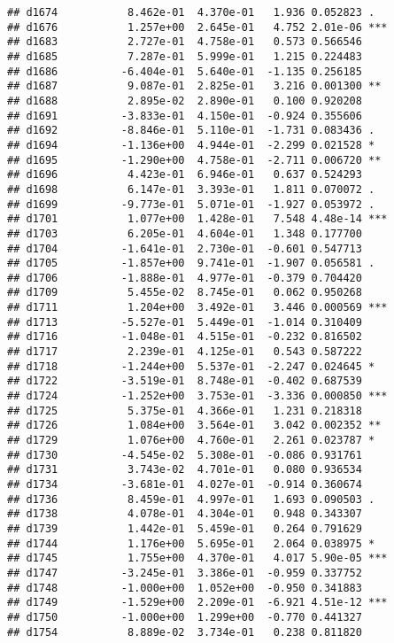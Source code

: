 \documentclass[
]{article}
\begin{document}
\begin{verbatim}
## d1674           8.462e-01  4.370e-01   1.936 0.052823 .  
## d1676           1.257e+00  2.645e-01   4.752 2.01e-06 ***
## d1683           2.727e-01  4.758e-01   0.573 0.566546    
## d1685           7.287e-01  5.999e-01   1.215 0.224483    
## d1686          -6.404e-01  5.640e-01  -1.135 0.256185    
## d1687           9.087e-01  2.825e-01   3.216 0.001300 ** 
## d1688           2.895e-02  2.890e-01   0.100 0.920208    
## d1691          -3.833e-01  4.150e-01  -0.924 0.355606    
## d1692          -8.846e-01  5.110e-01  -1.731 0.083436 .  
## d1694          -1.136e+00  4.944e-01  -2.299 0.021528 *  
## d1695          -1.290e+00  4.758e-01  -2.711 0.006720 ** 
## d1696           4.423e-01  6.946e-01   0.637 0.524293    
## d1698           6.147e-01  3.393e-01   1.811 0.070072 .  
## d1699          -9.773e-01  5.071e-01  -1.927 0.053972 .  
## d1701           1.077e+00  1.428e-01   7.548 4.48e-14 ***
## d1703           6.205e-01  4.604e-01   1.348 0.177700    
## d1704          -1.641e-01  2.730e-01  -0.601 0.547713    
## d1705          -1.857e+00  9.741e-01  -1.907 0.056581 .  
## d1706          -1.888e-01  4.977e-01  -0.379 0.704420    
## d1709           5.455e-02  8.745e-01   0.062 0.950268    
## d1711           1.204e+00  3.492e-01   3.446 0.000569 ***
## d1713          -5.527e-01  5.449e-01  -1.014 0.310409    
## d1716          -1.048e-01  4.515e-01  -0.232 0.816502    
## d1717           2.239e-01  4.125e-01   0.543 0.587222    
## d1718          -1.244e+00  5.537e-01  -2.247 0.024645 *  
## d1722          -3.519e-01  8.748e-01  -0.402 0.687539    
## d1724          -1.252e+00  3.753e-01  -3.336 0.000850 ***
## d1725           5.375e-01  4.366e-01   1.231 0.218318    
## d1726           1.084e+00  3.564e-01   3.042 0.002352 ** 
## d1729           1.076e+00  4.760e-01   2.261 0.023787 *  
## d1730          -4.545e-02  5.308e-01  -0.086 0.931761    
## d1731           3.743e-02  4.701e-01   0.080 0.936534    
## d1734          -3.681e-01  4.027e-01  -0.914 0.360674    
## d1736           8.459e-01  4.997e-01   1.693 0.090503 .  
## d1738           4.078e-01  4.304e-01   0.948 0.343307    
## d1739           1.442e-01  5.459e-01   0.264 0.791629    
## d1744           1.176e+00  5.695e-01   2.064 0.038975 *  
## d1745           1.755e+00  4.370e-01   4.017 5.90e-05 ***
## d1747          -3.245e-01  3.386e-01  -0.959 0.337752    
## d1748          -1.000e+00  1.052e+00  -0.950 0.341883    
## d1749          -1.529e+00  2.209e-01  -6.921 4.51e-12 ***
## d1750          -1.000e+00  1.299e+00  -0.770 0.441327    
## d1754           8.889e-02  3.734e-01   0.238 0.811820    

\end{verbatim}
\end{document}
